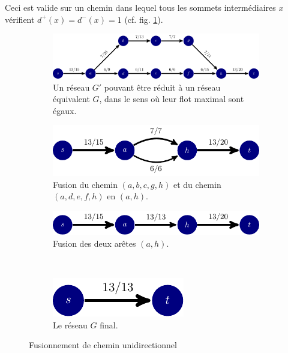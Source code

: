 \begin{description}
\begin{ex}
Ceci est valide sur un chemin dans lequel tous les sommets intermédiaires $x$ vérifient $d^+(x) = d^-(x) = 1$ (cf. fig. \ref{fig:edge-fusion-2}).


\begin{figure}[H]
\centering
  \begin{subfigure}[t]{\textwidth}
    \centering
    \includegraphics{img/26_1-1/26_1-1_3.pdf}
    \caption{Un réseau $G'$ pouvant être réduit à un réseau équivalent $G$, dans le sens où leur flot maximal sont égaux.}
  \end{subfigure}

  \begin{subfigure}[t]{\textwidth}
    \centering
    \includegraphics{img/26_1-1/26_1-1_4.pdf}
    \caption{Fusion du chemin $(a,b,c,g,h)$  et du chemin $(a,d,e,f,h)$ en $(a,h)$.}
  \end{subfigure}

  \begin{subfigure}[t]{0.49\textwidth}
    \centering
    \includegraphics{img/26_1-1/26_1-1_5.pdf}
    \caption{Fusion des deux arêtes $(a,h)$.}
  \end{subfigure}
~
  \begin{subfigure}[t]{0.49\textwidth}
    \centering
    \includegraphics{img/26_1-1/26_1-1_6.pdf}
    \caption{Le réseau $G$ final.}
  \end{subfigure}
  \caption{Fusionnement de chemin unidirectionnel}
  \label{fig:edge-fusion-2}
\end{figure}
\end{ex}

 \textit{}
 \textit{}
 \textit{}
 \textit{}
 \textit{}
 \textit{}

\end{description}
